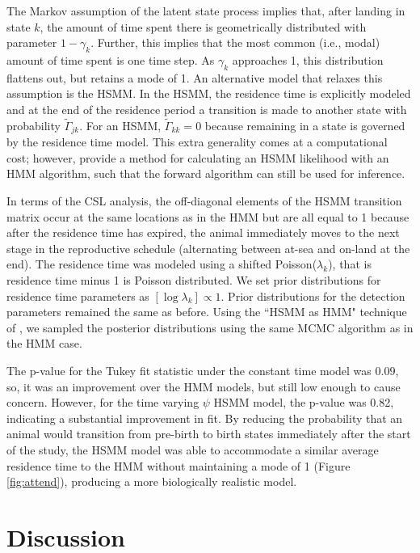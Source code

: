 \documentclass[12pt,english]{article}
\begin{document}
\begin{spacing}{1.9}
 The Markov assumption of the latent state process implies that, after landing in state $k$, the amount of time spent there is geometrically distributed with parameter $1-\gamma_k$. Further, this implies that the most common (i.e., modal) amount of time spent is one time step. As $\gamma_k$ approaches 1, this distribution flattens out, but retains a mode of 1. An alternative model that relaxes this assumption is the HSMM. In the HSMM, the residence time is explicitly modeled and at the end of the residence period a transition is made to another state with probability $\tilde\Gamma_{jk}$. For an HSMM, $\tilde\Gamma_{kk} = 0$ because remaining in a state is governed by the residence time model. This extra generality comes at a computational cost; however, \citet{langrock2011hidden} provide a method for calculating an HSMM likelihood with an HMM algorithm, such that the forward algorithm can still be used for inference.

    In terms of the CSL analysis, the off-diagonal elements of the HSMM transition matrix occur at the same locations as in the HMM but are all equal to 1 because after the residence time has expired, the animal immediately moves to the next stage in the reproductive schedule (alternating between at-sea and on-land at the end). The residence time was modeled using a shifted Poisson($\lambda_k$), that is residence time minus 1 is Poisson distributed. We set prior distributions for residence time parameters as $[\log \lambda_k] \propto 1$.  Prior distributions for the detection parameters remained the same as before.  Using the ``HSMM as HMM" technique of \citet{langrock2011hidden}, we sampled the posterior distributions using the same MCMC algorithm as in the HMM case.

    The p-value for the Tukey fit statistic under the constant time model was $0.09$, so, it was an improvement over the HMM models, but still low enough to cause concern. However, for the time varying $\psi$ HSMM model, the p-value was 0.82, indicating a substantial improvement in fit. By reducing the probability that an animal would transition from pre-birth to birth states immediately after the start of the study, the HSMM model was able to accommodate a similar average residence time to the HMM without maintaining a mode of 1 (Figure \ref{fig:attend}), producing a more biologically realistic model.



\section{Discussion}


\end{spacing}
\end{document}
